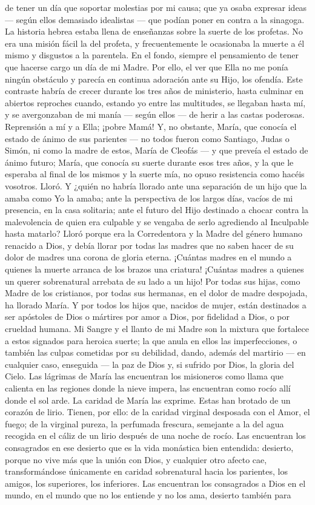\documentclass[12pt, twoside, openright]{book} %
\begin{document}
de tener un día que soportar molestias por mi causa; que ya osaba expresar ideas — según ellos demasiado idealistas — que podían poner en contra a la sinagoga. La historia hebrea estaba llena de enseñanzas sobre la suerte de los profetas. No era una misión fácil la del profeta, y frecuentemente le ocasionaba la muerte a él mismo y disgustos a la parentela. En el fondo, siempre el pensamiento de tener que hacerse cargo un día de mi Madre. Por ello, el ver que Ella no me ponía ningún obstáculo y parecía en continua adoración ante su Hijo, los ofendía. Este contraste habría de crecer durante los tres años de ministerio, hasta culminar en abiertos reproches cuando, estando yo entre las multitudes, se llegaban hasta mí, y se avergonzaban de mi manía — según ellos — de herir a las castas poderosas. Reprensión a mí y a Ella; ¡pobre Mamá! Y, no obstante, María, que conocía el estado de ánimo de sus parientes — no todos fueron como Santiago, Judas o Simón, ni como la madre de estos, María de Cleofás — y que preveía el estado de ánimo futuro; María, que conocía su suerte durante esos tres años, y la que le esperaba al final de los mismos y la suerte mía, no opuso resistencia como hacéis vosotros. Lloró. Y ¿quién no habría llorado ante una separación de un hijo que la amaba como Yo la amaba; ante la perspectiva de los largos días, vacíos de mi presencia, en la casa solitaria; ante el futuro del Hijo destinado a chocar contra la malevolencia de quien era culpable y se vengaba de serlo agrediendo al Inculpable hasta matarlo? Lloró porque era la Corredentora y la Madre del género humano renacido a Dios, y debía llorar por todas las madres que no saben hacer de su dolor de madres una corona de gloria eterna. ¡Cuántas madres en el mundo a quienes la muerte arranca de los brazos una criatura! ¡Cuántas madres a quienes un querer sobrenatural arrebata de su lado a un hijo! Por todas sus hijas, como Madre de los cristianos, por todas sus hermanas, en el dolor de madre despojada, ha llorado María. Y por todos los hijos que, nacidos de mujer, están destinados a ser apóstoles de Dios o mártires por amor a Dios, por fidelidad a Dios, o por crueldad humana. Mi Sangre y el llanto de mi Madre son la mixtura que fortalece a estos signados para heroica suerte; la que anula en ellos las imperfecciones, o también las culpas cometidas por su debilidad, dando, además del martirio — en cualquier caso, enseguida — la paz de Dios y, si sufrido por Dios, la gloria del Cielo. Las lágrimas de María las encuentran los misioneros como llama que calienta en las regiones donde la nieve impera, las encuentran como rocío allí donde el sol arde. La caridad de María las exprime. Estas han brotado de un corazón de lirio. Tienen, por ello: de la caridad virginal desposada con el Amor, el fuego; de la virginal pureza, la perfumada frescura, semejante a la del agua recogida en el cáliz de un lirio después de una noche de rocío. Las encuentran los consagrados en ese desierto que es la vida monástica bien entendida: desierto, porque no vive más que la unión con Dios, y cualquier otro afecto cae, transformándose únicamente en caridad sobrenatural hacia los parientes, los amigos, los superiores, los inferiores. Las encuentran los consagrados a Dios en el mundo, en el mundo que no los entiende y no los ama, desierto también para 
\end{document}

